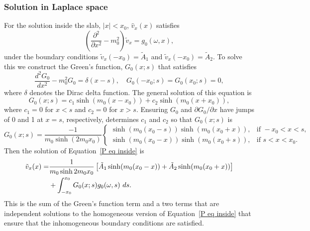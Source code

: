 \documentclass[12pt, draft]{../style-files/ociamthesis}
\begin{document}
\subsubsection{Solution in Laplace space}

For the solution inside the slab, $|x| < x_0$, $\hat{v}_x(x)$ satisfies
\begin{equation}
\left( \frac{\partial^2}{\partial x^2} - m_0^2 \right) \tilde{v}_x = g_0(\omega, x),
\end{equation}
under the boundary conditions $\tilde{v}_x(-x_0) = \tilde{A}_1$ and $\tilde{v}_x(-x_0) = \tilde{A}_2$. To solve this we construct the Green's function, $G_0(x;s)$ that satisfies
\begin{equation}
\frac{d^2G_0}{dx^2} - m_0^2 G_0 = \delta(x-s), \quad G_0(-x_0;s) = G_0(x_0;s) = 0,
\end{equation}
where $\delta$ denotes the Dirac delta function. The general solution of this equation is
\begin{equation}
G_0(x;s) = c_1\sinh(m_0(x - x_0)) + c_2\sinh(m_0(x + x_0)),
\end{equation}
where $c_1 = 0$ for $x < s$ and $c_2 = 0$ for $x > s$. Ensuring $G_0$ and $\partial G_0 / \partial x$ have jumps of 0 and 1 at $x = s$, respectively, determines $c_1$ and $c_2$ so that $G_0(x;s)$ is
\begin{equation}
G_0(x;s) = \frac{-1}{m_0\sinh(2m_0 x_0)}
\begin{cases}
\sinh(m_0(x_0 - s))\sinh(m_0(x_0 + x)), & \text{if } -x_0<x<s, \\
\sinh(m_0(x_0 - x))\sinh(m_0(x_0 + s)), & \text{if } s<x<x_0.
\end{cases}
\end{equation}
Then the solution of Equation~\eqref{P eq inside} is
\begin{align}
\tilde{v}_x(x) = &\frac{1}{m_0\sinh{2m_0 x_0}} \left[ \tilde{A}_1\sinh(m_0(x_0 - x)) + \tilde{A}_2\sinh(m_0(x_0 + x)) \right] \notag \\
&+ \int_{-x_0}^{x_0} G_0(x;s) g_0(\omega, s) ~ds.
\label{V sol 0}
\end{align}
This is the sum of the Green's function term and a two terms that are independent solutions to the homogeneous version of Equation~\eqref{P eq inside} that ensure that the inhomogeneous boundary conditions are satisfied.
\end{document}
